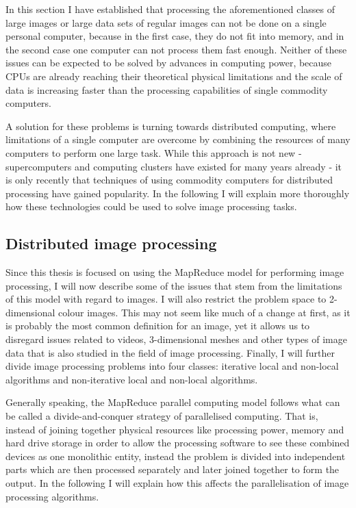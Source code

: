 \documentclass [12pt,a4paper]{report}
\begin{document}
In this section I have established that processing the aforementioned classes of large images or large data sets of regular images can not be done on a single personal computer, because in the first case, they do not fit into memory, and in the second case one computer can not process them fast enough. Neither of these issues can be expected to be solved by advances in computing power, because CPUs are already reaching their theoretical physical limitations  and the scale of data is increasing faster than the processing capabilities of single commodity computers. 

A solution for these problems is turning towards distributed computing, where limitations of a single computer are overcome by combining the resources of many computers to perform one large task. While this approach is not new - supercomputers and computing clusters have existed for many years already - it is only recently that techniques of using commodity computers for distributed processing have gained popularity. In the following I will explain more thoroughly how these technologies could be used to solve image processing tasks.

\subsection{Distributed image processing}

Since this thesis is focused on using the MapReduce model for performing image processing, I will now describe some of the issues that stem from the limitations of this model with regard to images. I will also restrict the problem space to 2-dimensional colour images. This may not seem like much of a change at first, as it is probably the most common definition for an image, yet it allows us to disregard issues related to videos, 3-dimensional meshes and other types of image data that is also studied in the field of image processing. Finally, I will further divide image processing problems into four classes: iterative local and non-local algorithms and non-iterative local and non-local algorithms.

Generally speaking, the MapReduce parallel computing model follows what can be called a divide-and-conquer strategy of parallelised computing. That is, instead of joining together physical resources like processing power, memory and hard drive storage in order to allow the processing software to see these combined devices as one monolithic entity, instead the problem is divided into independent parts which are then processed separately and later joined together to form the output. In the following I will explain how this affects the parallelisation of image processing algorithms.
\end{document}
